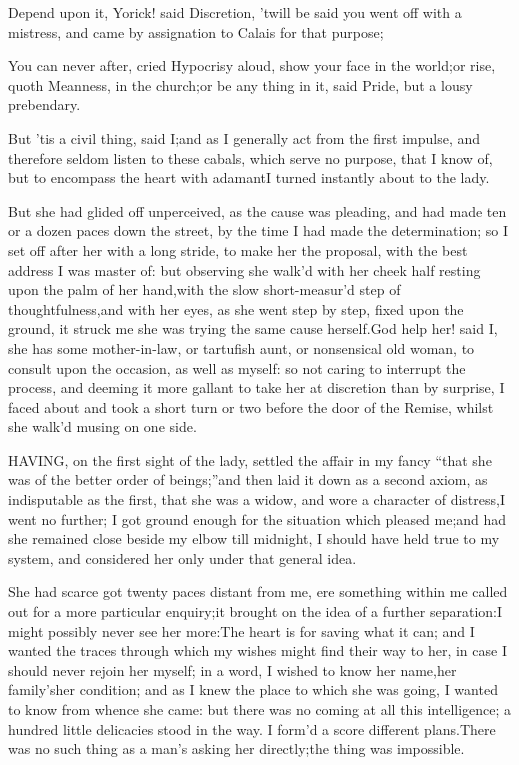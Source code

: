 \documentclass[twoside]{article}
\begin{document}
Depend upon it, Yorick! said Discretion, ’twill be said you went off with
a mistress, and came by assignation to Calais for that purpose;\tsk 

\tsk You can never after, cried Hypocrisy aloud, show your face in the
world;\tsk or rise, quoth Meanness, in the church;\tsk or be any thing in it,
said Pride, but a lousy prebendary.

But ’tis a civil thing, said I;\tsk and as I generally act from the first
impulse, and therefore seldom listen to these cabals, which serve no
purpose, that I know of, but to encompass the heart with adamant\tsk I turned
instantly about to the lady.\tsk 

\tsk But she had glided off unperceived, as the cause was pleading, and had
made ten or a dozen paces down the street, by the time I had made the
determination; so I set off after her with a long stride, to make her the
proposal, with the best address I was master of: but observing she walk’d
with her cheek half resting upon the palm of her hand,\tsk with the slow
short-measur’d step of thoughtfulness,\tsk and with her eyes, as she went
step by step, fixed upon the ground, it struck me she was trying the same
cause herself.\tsk God help her! said I, she has some mother-in-law, or
tartufish aunt, or nonsensical old woman, to consult upon the occasion,
as well as myself: so not caring to interrupt the process, and deeming it
more gallant to take her at discretion than by surprise, I faced about
and took a short turn or two before the door of the Remise, whilst she
walk’d musing on one side.






HAVING, on the first sight of the lady, settled the affair in my fancy
“that she was of the better order of beings;”\tsk and then laid it down as a
second axiom, as indisputable as the first, that she was a widow, and
wore a character of distress,\tsk I went no further; I got ground enough for
the situation which pleased me;\tsk and had she remained close beside my
elbow till midnight, I should have held true to my system, and considered
her only under that general idea.

She had scarce got twenty paces distant from me, ere something within me
called out for a more particular enquiry;\tsk it brought on the idea of a
further separation:\tsk I might possibly never see her more:\tsk The heart is for
saving what it can; and I wanted the traces through which my wishes might
find their way to her, in case I should never rejoin her myself; in a
word, I wished to know her name,\tsk her family’s\tsk her condition; and as I
knew the place to which she was going, I wanted to know from whence she
came: but there was no coming at all this intelligence; a hundred little
delicacies stood in the way.  I form’d a score different plans.\tsk There was
no such thing as a man’s asking her directly;\tsk the thing was impossible.
\end{document}

